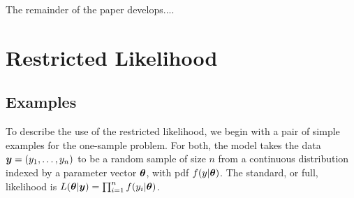 \documentclass[ba]{imsart}
\def\bth{\mbox{\boldmath $\theta$}}
\newcommand{\by}{\mbox{\boldmath $y$}}
\newcommand{\red}[1]{{\color{red}#1}}
\newcommand{\green}[1]{{\color{green}#1}}
\begin{document}

The remainder of the paper develops....  %

\section{Restricted Likelihood}
\label{restrictedlikelihood}

\subsection{Examples}
To describe the use of the restricted likelihood, 
we begin with a pair of simple examples for the one-sample problem.  For both, the model takes the data $\by=(y_1,\ldots,y_n)$ to be a random sample
of size $n$ from a continuous distribution indexed by a parameter
vector $\bth$, with pdf $f(y| \bth)$.  The standard, or full,
likelihood is $L(\bth | \by) = \prod_{i=1}^n f(y_i | \bth)$.  
\end{document}
